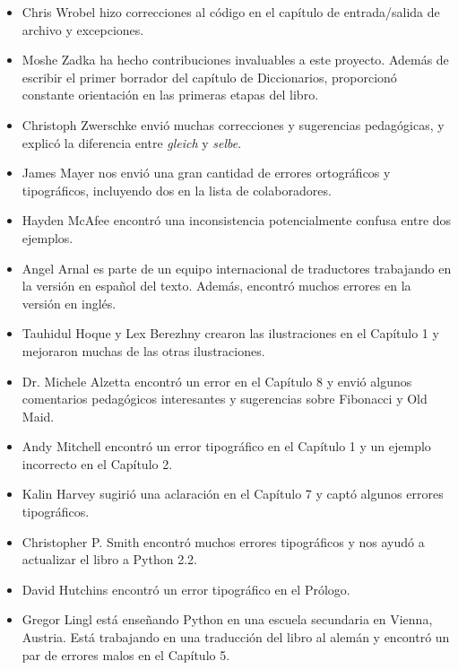 \documentclass[10pt]{book}
\begin{document}
\begin{itemize}
\item Chris Wrobel hizo correcciones al código en el capítulo de
entrada/salida de archivo y excepciones.

\item Moshe Zadka ha hecho contribuciones invaluables a este proyecto.
Además de escribir el primer borrador del capítulo de Diccionarios,
proporcionó constante orientación en las primeras etapas del libro.

\item Christoph Zwerschke envió muchas correcciones y
sugerencias pedagógicas, y explicó la diferencia entre {\em gleich}
y {\em selbe}.

\item James Mayer nos envió una gran cantidad de errores ortográficos
y tipográficos, incluyendo dos en la lista de colaboradores.

\item Hayden McAfee encontró una inconsistencia potencialmente confusa
entre dos ejemplos.

\item Angel Arnal es parte de un equipo internacional de traductores
trabajando en la versión en español del texto.  Además, encontró muchos
errores en la versión en inglés.

\item Tauhidul Hoque y Lex Berezhny crearon las ilustraciones
en el Capítulo 1 y mejoraron muchas de las otras ilustraciones.

\item Dr. Michele Alzetta encontró un error en el Capítulo 8 y envió
algunos comentarios pedagógicos interesantes y sugerencias sobre Fibonacci
y Old Maid.

\item Andy Mitchell encontró un error tipográfico en el Capítulo 1 y un ejemplo
incorrecto en el Capítulo 2.

\item Kalin Harvey sugirió una aclaración en el Capítulo 7 y
captó algunos errores tipográficos.

\item Christopher P. Smith encontró muchos errores tipográficos y nos ayudó a
actualizar el libro a Python 2.2.

\item David Hutchins encontró un error tipográfico en el Prólogo.

\item Gregor Lingl está enseñando Python en una escuela secundaria en Vienna,
Austria.  Está trabajando en una traducción del libro al alemán
y encontró un par de errores malos en el Capítulo 5.


\end{itemize}
\end{document}
